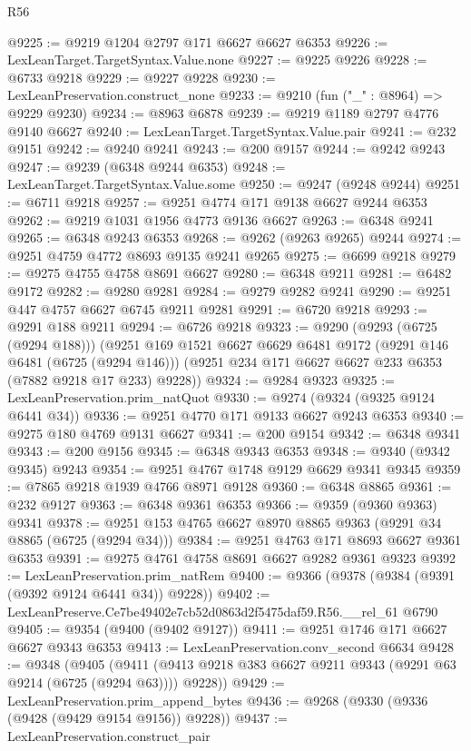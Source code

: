 \begin{lexlean}{R56}
\begin{coremodule}
@9225 := @9219 @1204 @2797 @171 @6627 @6627 @6353
@9226 := LexLeanTarget.TargetSyntax.Value.none
@9227 := @9225 @9226
@9228 := @6733 @9218
@9229 := @9227 @9228
@9230 := LexLeanPreservation.construct_none
@9233 := @9210 (fun ("_" : @8964) => @9229 @9230)
@9234 := @8963 @6878
@9239 := @9219 @1189 @2797 @4776 @9140 @6627
@9240 := LexLeanTarget.TargetSyntax.Value.pair
@9241 := @232 @9151
@9242 := @9240 @9241
@9243 := @200 @9157
@9244 := @9242 @9243
@9247 := @9239 (@6348 @9244 @6353)
@9248 := LexLeanTarget.TargetSyntax.Value.some
@9250 := @9247 (@9248 @9244)
@9251 := @6711 @9218
@9257 := @9251 @4774 @171 @9138 @6627 @9244 @6353
@9262 := @9219 @1031 @1956 @4773 @9136 @6627
@9263 := @6348 @9241
@9265 := @6348 @9243 @6353
@9268 := @9262 (@9263 @9265) @9244
@9274 := @9251 @4759 @4772 @8693 @9135 @9241 @9265
@9275 := @6699 @9218
@9279 := @9275 @4755 @4758 @8691 @6627
@9280 := @6348 @9211
@9281 := @6482 @9172
@9282 := @9280 @9281
@9284 := @9279 @9282 @9241
@9290 := @9251 @447 @4757 @6627 @6745 @9211 @9281
@9291 := @6720 @9218
@9293 := @9291 @188 @9211
@9294 := @6726 @9218
@9323 := @9290
    (@9293 (@6725 (@9294 @188)))
    (@9251
      @169
      @1521
      @6627
      @6629
      @6481
      @9172
      (@9291 @146 @6481 (@6725 (@9294 @146)))
      (@9251 @234 @171 @6627 @6627 @233 @6353 (@7882 @9218 @17 @233) @9228))
@9324 := @9284 @9323
@9325 := LexLeanPreservation.prim_natQuot
@9330 := @9274 (@9324 (@9325 @9124 @6441 @34))
@9336 := @9251 @4770 @171 @9133 @6627 @9243 @6353
@9340 := @9275 @180 @4769 @9131 @6627
@9341 := @200 @9154
@9342 := @6348 @9341
@9343 := @200 @9156
@9345 := @6348 @9343 @6353
@9348 := @9340 (@9342 @9345) @9243
@9354 := @9251 @4767 @1748 @9129 @6629 @9341 @9345
@9359 := @7865 @9218 @1939 @4766 @8971 @9128
@9360 := @6348 @8865
@9361 := @232 @9127
@9363 := @6348 @9361 @6353
@9366 := @9359 (@9360 @9363) @9341
@9378 := @9251 @153 @4765 @6627 @8970 @8865 @9363 (@9291 @34 @8865 (@6725 (@9294 @34)))
@9384 := @9251 @4763 @171 @8693 @6627 @9361 @6353
@9391 := @9275 @4761 @4758 @8691 @6627 @9282 @9361 @9323
@9392 := LexLeanPreservation.prim_natRem
@9400 := @9366 (@9378 (@9384 (@9391 (@9392 @9124 @6441 @34)) @9228))
@9402 := LexLeanPreserve.Ce7be49402e7cb52d0863d2f5475daf59.R56.__rel_61 @6790
@9405 := @9354 (@9400 (@9402 @9127))
@9411 := @9251 @1746 @171 @6627 @6627 @9343 @6353
@9413 := LexLeanPreservation.conv_second @6634
@9428 := @9348
    (@9405 (@9411 (@9413 @9218 @383 @6627 @9211 @9343 (@9291 @63 @9214 (@6725 (@9294 @63)))) @9228))
@9429 := LexLeanPreservation.prim_append_bytes
@9436 := @9268 (@9330 (@9336 (@9428 (@9429 @9154 @9156)) @9228))
@9437 := LexLeanPreservation.construct_pair

\end{coremodule}
\end{lexlean}
